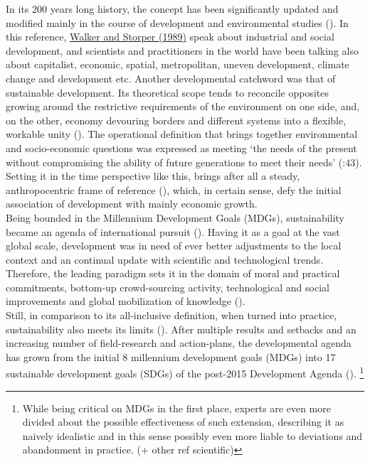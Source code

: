 \documentclass[11pt]{report}
\begin{document}
In its 200 years long history, the concept has been significantly updated and modified mainly in the course of development and environmental studies (\href{Vujosevic}{\cite{VujosevicEtAl.2012}}). 
In this reference, \href{Walker}{Walker and Storper (1989)} speak about industrial and social development, and scientists and practitioners in the world have been talking also about capitalist, economic, spatial, metropolitan, uneven development, climate change and development etc.
Another developmental catchword was that of sustainable development.
Its theoretical scope tends to reconcile opposites growing around the restrictive requirements of the environment on one side, and, on the other, economy devouring borders and different systems into a flexible, workable unity (\href{}{\cite{Bolay what sustainable development 2012}}).
The operational definition that brings together environmental and socio-economic questions was expressed as meeting ‘the needs of the present without compromising the ability of future generations to meet their needs’ (\href{WCED}{\cite{WCED1987????????}}:43).
Setting it in the time perspective like this, brings after all a steady, anthropocentric frame of reference (\href{Lee}{\cite{Lee2000}}), which, in certain sense, defy the initial association of development with mainly economic growth.
\\

Being bounded in the Millennium Development Goals (MDGs), sustainability became an agenda of international pursuit (\href{MDG}{\cite{MDG ??????}}).
Having it as a goal at the vast global scale, development was in need of ever better adjustments to the local context and an continual update with scientific and technological trends.
Therefore, the leading paradigm sets it in the domain of moral and practical commitments, bottom-up crowd-sourcing activity, technological and social improvements and global mobilization of knowledge (\href{Sachs}{\cite{Sachs2012????}}).
\\

Still, in comparison to its all-inclusive definition, when turned into practice, sustainability also meets its limits (\href{}{\cite{Bolay what sustainable development 2012}}).
After multiple results and setbacks and an increasing number of field-research and action-plans, the developmental agenda has grown from the initial 8 millennium development goals (MDGs) into 17 sustainable development goals (SDGs) of the post-2015 Development Agenda (\href{SDG}{\cite{Post-2015DevelopmentAgenda ??????}}).
\footnote{While being critical on MDGs in the first place, experts are even more divided about the possible effectiveness of such extension, describing it as naively idealistic and in this sense possibly even more liable to deviations and abandonment in practice.
(\href{FinancialTimes}{\cite{FT}}+ other ref scientific)}
\\
\end{document}
